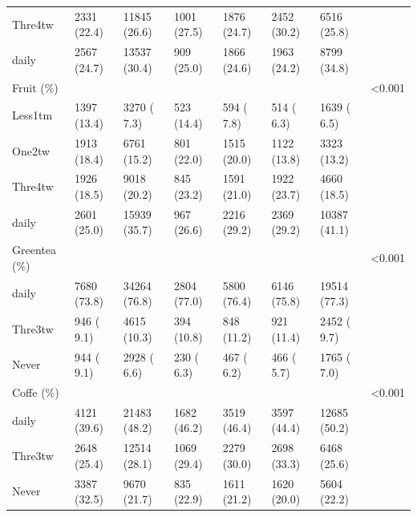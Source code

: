\documentclass[]{tufte-handout}
\begin{document}
\begin{table}[!htbp]
\begin{tabular}[t]{llllllll}
\rowcolor{gray!6}  \hspace{1em}Thre4tw & 2331 (22.4) & 11845 (26.6) & 1001 (27.5) & 1876 (24.7) & 2452 (30.2) & 6516 (25.8) & \\
\hspace{1em}daily & 2567 (24.7) & 13537 (30.4) & 909 (25.0) & 1866 (24.6) & 1963 (24.2) & 8799 (34.8) & \\
\rowcolor{gray!6}  Fruit (\%) &  &  &  &  &  &  & <0.001\\
\hspace{1em}Less1tm & 1397 (13.4) & 3270 ( 7.3) & 523 (14.4) & 594 ( 7.8) & 514 ( 6.3) & 1639 ( 6.5) & \\
\rowcolor{gray!6}  \hspace{1em}One2tw & 1913 (18.4) & 6761 (15.2) & 801 (22.0) & 1515 (20.0) & 1122 (13.8) & 3323 (13.2) & \\
\hspace{1em}Thre4tw & 1926 (18.5) & 9018 (20.2) & 845 (23.2) & 1591 (21.0) & 1922 (23.7) & 4660 (18.5) & \\
\rowcolor{gray!6}  \hspace{1em}daily & 2601 (25.0) & 15939 (35.7) & 967 (26.6) & 2216 (29.2) & 2369 (29.2) & 10387 (41.1) & \\
Greentea (\%) &  &  &  &  &  &  & <0.001\\
\rowcolor{gray!6}  \hspace{1em}daily & 7680 (73.8) & 34264 (76.8) & 2804 (77.0) & 5800 (76.4) & 6146 (75.8) & 19514 (77.3) & \\
\hspace{1em}Thre3tw & 946 ( 9.1) & 4615 (10.3) & 394 (10.8) & 848 (11.2) & 921 (11.4) & 2452 ( 9.7) & \\
\rowcolor{gray!6}  \hspace{1em}Never & 944 ( 9.1) & 2928 ( 6.6) & 230 ( 6.3) & 467 ( 6.2) & 466 ( 5.7) & 1765 ( 7.0) & \\
Coffe (\%) &  &  &  &  &  &  & <0.001\\
\rowcolor{gray!6}  \hspace{1em}daily & 4121 (39.6) & 21483 (48.2) & 1682 (46.2) & 3519 (46.4) & 3597 (44.4) & 12685 (50.2) & \\
\hspace{1em}Thre3tw & 2648 (25.4) & 12514 (28.1) & 1069 (29.4) & 2279 (30.0) & 2698 (33.3) & 6468 (25.6) & \\
\rowcolor{gray!6}  \hspace{1em}Never & 3387 (32.5) & 9670 (21.7) & 835 (22.9) & 1611 (21.2) & 1620 (20.0) & 5604 (22.2) & \\

\end{tabular}
\end{table}
\end{document}
